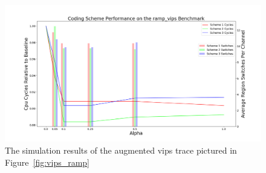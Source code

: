 \begin{figure}[htbp]
		\includegraphics[width=\linewidth]{fig/vips_ramp_results.png}
		\caption{The simulation results of the augmented vips trace pictured in Figure~\ref{fig:vips_ramp}}
		\label{fig:vips_ramp_result}
\end{figure}

